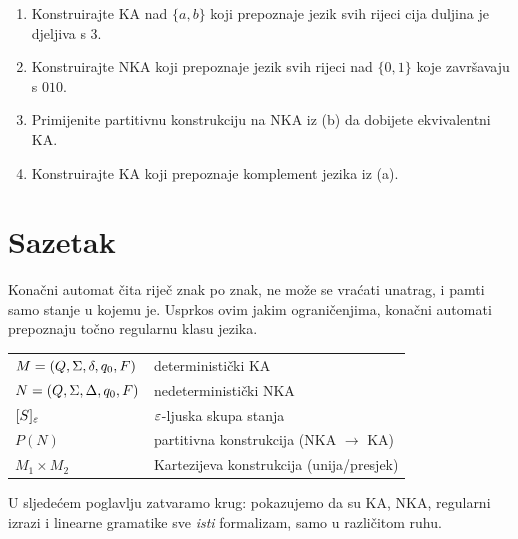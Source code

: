 \begin{zadatak}
\begin{enumerate}[label=(\alph*), itemsep=4pt]
  \item Konstruirajte KA nad $\{a,b\}$ koji prepoznaje jezik svih rijeci
        cija duljina je djeljiva s $3$.
  \item Konstruirajte NKA koji prepoznaje jezik svih rijeci nad $\{0,1\}$
        koje završavaju s $010$.
  \item Primijenite partitivnu konstrukciju na NKA iz (b) da dobijete
        ekvivalentni KA.
  \item Konstruirajte KA koji prepoznaje komplement jezika iz (a).
\end{enumerate}
\end{zadatak}

\section*{Sazetak}

Konačni automat čita riječ znak po znak, ne može se vraćati unatrag,
i pamti samo stanje u kojemu je. Usprkos ovim jakim ograničenjima,
konačni automati prepoznaju točno regularnu klasu jezika.

\medskip
\noindent
\begin{tabular}{ll}
  $M = (Q, \Sigma, \delta, q_0, F)$ & deterministički KA \\
  $N = (Q, \Sigma, \Delta, q_0, F)$ & nedeterministički NKA \\
  $[S]_\varepsilon$ & $\varepsilon$-ljuska skupa stanja \\
  $P(N)$ & partitivna konstrukcija (NKA $\to$ KA) \\
  $M_1 \times M_2$ & Kartezijeva konstrukcija (unija/presjek) \\
\end{tabular}

\medskip
\noindent U sljedećem poglavlju zatvaramo krug: pokazujemo da su
KA, NKA, regularni izrazi i linearne gramatike sve \emph{isti} formalizam,
samo u različitom ruhu.

